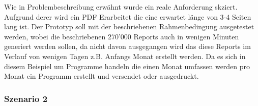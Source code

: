 \documentclass[main.tex]{subfiles}
\begin{document}
Wie in Problembeschreibung erwähnt wurde ein reale Anforderung skziert. Aufgrund derer wird ein PDF Erarbeitet die eine erwartet länge von 3-4 Seiten lang ist. Der Prototyp soll mit der beschriebenen Rahmenbedingung ausgetestet werden, wobei die beschriebenen 270'000 Reports auch in wenigen Minuten generiert werden sollen, da nicht davon ausgegangen wird das diese Reports im Verlauf von wenigen Tagen z.B. Anfangs Monat erstellt werden. Da es sich in diesem Beispiel um Programme handeln die einen Monat umfassen werden pro Monat ein Programm erstellt und versendet oder ausgedruckt. 
\subsubsection{Szenario 2}
\end{document}
